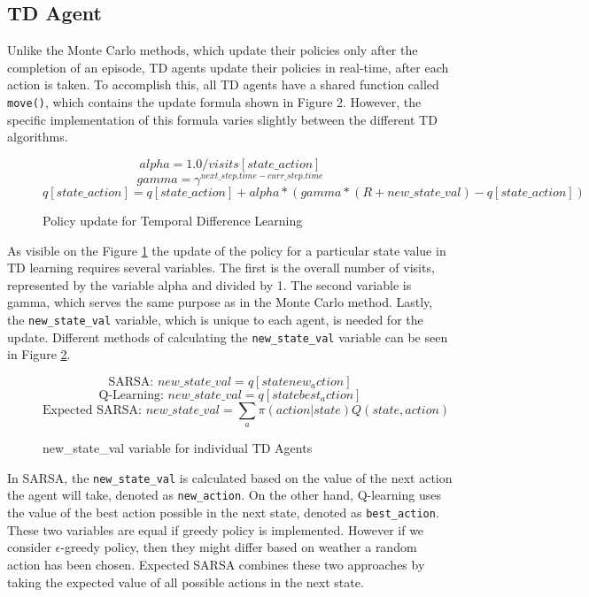 \subsection{TD Agent}	
Unlike the Monte Carlo methods, which update their policies only after the completion of an episode, TD agents update their policies in real-time, after each action is taken. To accomplish this, all TD agents have a shared function called \texttt{move()}, which contains the update formula shown in Figure 2. However, the specific implementation of this formula varies slightly between the different TD algorithms.
\begin{figure}[h]
    $$ alpha = 1.0 / visits[state\_action] $$
    $$ gamma = \gamma^{next\_step.time - curr\_step.time} $$
    $$ q[state\_action] = q[state\_action] + alpha * (gamma * (R + new\_state\_val) - q[state\_action]) $$
    \caption{Policy update for Temporal Difference Learning}
    \label{tdUpdate}
\end{figure}
As visible on the Figure \ref{tdUpdate} the update of the policy for a particular state value in TD learning requires several variables. The first is the overall number of visits, represented by the variable alpha and divided by 1. The second variable is gamma, which serves the same purpose as in the Monte Carlo method. Lastly, the \texttt{new\_state\_val} variable, which is unique to each agent, is needed for the update. Different methods of calculating the \texttt{new\_state\_val} variable can be seen in Figure \ref{tdIndivUpdate}.
\begin{figure}[h]
    $$ \text{SARSA: } new\_state\_val = q[state new_action] $$ 
	$$ \text{Q-Learning: } new\_state\_val = q[state best_action] $$ 
	$$ \text{Expected SARSA: } new\_state\_val = \sum_a \pi (action|state) Q(state,action) $$ 
    \caption{new\_state\_val variable for individual TD Agents}
    \label{tdIndivUpdate}
\end{figure}
In SARSA, the \texttt{new\_state\_val} is calculated based on the value of the next action the agent will take, denoted as \texttt{new\_action}. On the other hand, Q-learning uses the value of the best action possible in the next state, denoted as \texttt{best\_action}. These two variables are equal if greedy policy is implemented. However if we consider $\epsilon$-greedy policy, then they might differ based on weather a random action has been chosen. Expected SARSA combines these two approaches by taking the expected value of all possible actions in the next state. 
